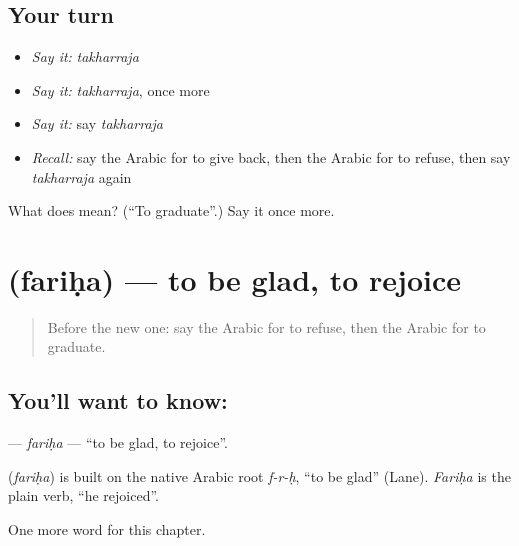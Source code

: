 \subsection*{Your turn}
\begin{itemize}
\raggedright
  \item \emph{Say it:} \emph{takharraja}
  \item \emph{Say it:} \emph{takharraja}, once more
  \item \emph{Say it:} say \emph{takharraja}
  \item \emph{Recall:} say the Arabic for to give back, then the Arabic for to refuse, then say \emph{takharraja} again
\end{itemize}

\begin{tcolorbox}[breakable,colback=teal!4,colframe=teal!35!black,title={Before you move on}]
What does  mean? (\textquotedblleft{}To graduate\textquotedblright{}.) Say it once more.
\end{tcolorbox}
\section[\texorpdfstring{\ar{فرح} (fariḥa)}{فرح (fariḥa)}]{ (fariḥa) — to be glad, to rejoice}

\label{lesson:AR-C257-fariha}



\begin{quote}
Before the new one: say the Arabic for to refuse, then the Arabic for to graduate.
\end{quote}

\subsection*{You'll want to know: }
\textbf{} — \emph{fariḥa} — \textquotedblleft{}to be glad, to rejoice\textquotedblright{}.

\begin{cousinweb}
\textbf{} (\emph{fariḥa}) is built on the native Arabic root \emph{f-r-ḥ}, \textquotedblleft{}to be glad\textquotedblright{} (Lane). \emph{Fariḥa} is the plain verb, \textquotedblleft{}he rejoiced\textquotedblright{}.
\end{cousinweb}

\begin{grammarlens}[title={What you've built}]
One more word for this chapter.
\end{grammarlens}

